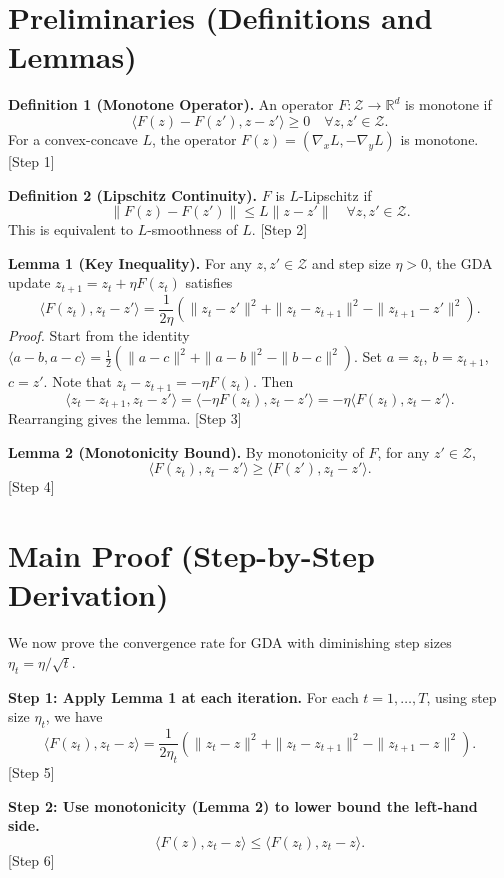 \documentclass{article}
\begin{document}
\section*{Preliminaries (Definitions and Lemmas)}

\textbf{Definition 1 (Monotone Operator).} An operator $F: \mathcal{Z} \to \mathbb{R}^d$ is monotone if
\[
\langle F(z) - F(z'), z - z' \rangle \ge 0 \quad \forall z, z' \in \mathcal{Z}.
\]
For a convex-concave $L$, the operator $F(z) = (\nabla_x L, -\nabla_y L)$ is monotone. [Step 1]

\textbf{Definition 2 (Lipschitz Continuity).} $F$ is $L$-Lipschitz if
\[
\|F(z) - F(z')\| \le L \|z - z'\| \quad \forall z, z' \in \mathcal{Z}.
\]
This is equivalent to $L$-smoothness of $L$. [Step 2]

\textbf{Lemma 1 (Key Inequality).} For any $z, z' \in \mathcal{Z}$ and step size $\eta > 0$, the GDA update $z_{t+1} = z_t + \eta F(z_t)$ satisfies
\[
\langle F(z_t), z_t - z' \rangle = \frac{1}{2\eta} \left( \|z_t - z'\|^2 + \|z_t - z_{t+1}\|^2 - \|z_{t+1} - z'\|^2 \right).
\]
\textit{Proof.} Start from the identity $\langle a - b, a - c \rangle = \frac{1}{2}(\|a-c\|^2 + \|a-b\|^2 - \|b-c\|^2)$. Set $a = z_t$, $b = z_{t+1}$, $c = z'$. Note that $z_t - z_{t+1} = -\eta F(z_t)$. Then
\[
\langle z_t - z_{t+1}, z_t - z' \rangle = \langle -\eta F(z_t), z_t - z' \rangle = -\eta \langle F(z_t), z_t - z' \rangle.
\]
Rearranging gives the lemma. [Step 3]

\textbf{Lemma 2 (Monotonicity Bound).} By monotonicity of $F$, for any $z' \in \mathcal{Z}$,
\[
\langle F(z_t), z_t - z' \rangle \ge \langle F(z'), z_t - z' \rangle.
\]
[Step 4]

\section*{Main Proof (Step-by-Step Derivation)}

We now prove the convergence rate for GDA with diminishing step sizes $\eta_t = \eta/\sqrt{t}$.

\textbf{Step 1: Apply Lemma 1 at each iteration.}
For each $t = 1, \dots, T$, using step size $\eta_t$, we have
\[
\langle F(z_t), z_t - z \rangle = \frac{1}{2\eta_t} \left( \|z_t - z\|^2 + \|z_t - z_{t+1}\|^2 - \|z_{t+1} - z\|^2 \right). \tag{1}
\]
[Step 5]

\textbf{Step 2: Use monotonicity (Lemma 2) to lower bound the left-hand side.}
\[
\langle F(z), z_t - z \rangle \le \langle F(z_t), z_t - z \rangle. \tag{2}
\]
[Step 6]
\end{document}

